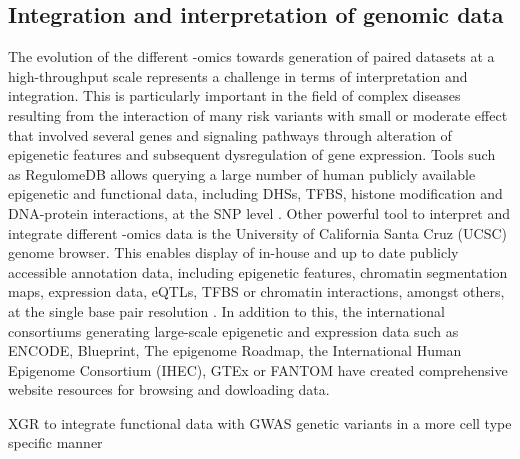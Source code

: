 



\subsection{Integration and interpretation of genomic data}
The evolution of the different -omics towards generation of paired datasets at a high-throughput scale represents a challenge in terms of interpretation and integration. This is particularly important in the field of complex diseases resulting from the interaction of many risk variants with small or moderate effect that involved several genes and signaling pathways through alteration of epigenetic features and subsequent dysregulation of gene expression.
Tools such as RegulomeDB allows querying a large number of human publicly available epigenetic and functional data, including DHSs, TFBS, histone modification and DNA-protein interactions, at the SNP level \parencite{}. Other powerful tool to interpret and integrate different -omics data is the University of California Santa Cruz (UCSC) genome browser. This enables display of in-house and up to date publicly accessible annotation data, including epigenetic features, chromatin segmentation maps, expression data, eQTLs, TFBS or chromatin interactions, amongst others, at the single base pair resolution \parencite{}. In addition to this, the international consortiums generating large-scale epigenetic and expression data such as ENCODE, Blueprint, The epigenome Roadmap, the International Human Epigenome Consortium (IHEC), GTEx or FANTOM have created comprehensive website resources for browsing and dowloading data.

 
XGR to integrate functional data with GWAS genetic variants in a more cell type specific manner


